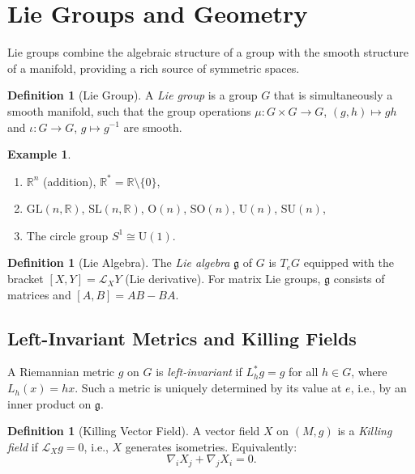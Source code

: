 \documentclass[12pt,a4paper]{amsart}
\theoremstyle{definition}
\newtheorem{definition}[theorem]{Definition}
\newtheorem{example}[theorem]{Example}
\begin{document}
\section{Lie Groups and Geometry}
\label{sec:liegroups}

Lie groups combine the algebraic structure of a group with the smooth
structure of a manifold, providing a rich source of symmetric spaces.

\begin{definition}[Lie Group]
A \emph{Lie group} is a group $G$ that is simultaneously a smooth manifold,
such that the group operations $\mu: G \times G \to G$, $(g,h) \mapsto gh$
and $\iota: G \to G$, $g \mapsto g^{-1}$ are smooth.
\end{definition}

\begin{example}
\begin{enumerate}[label=(\alph*)]
  \item $\mathbb{R}^n$ (addition), $\mathbb{R}^* = \mathbb{R} \setminus \{0\}$,
  \item $\mathrm{GL}(n,\mathbb{R})$, $\mathrm{SL}(n,\mathbb{R})$, $\mathrm{O}(n)$, $\mathrm{SO}(n)$, $\mathrm{U}(n)$, $\mathrm{SU}(n)$,
  \item The circle group $S^1 \cong \mathrm{U}(1)$.
\end{enumerate}
\end{example}

\begin{definition}[Lie Algebra]
The \emph{Lie algebra} $\mathfrak{g}$ of $G$ is $T_eG$ equipped with the
bracket $[X, Y] = \mathcal{L}_X Y$ (Lie derivative). For matrix Lie groups,
$\mathfrak{g}$ consists of matrices and $[A,B] = AB - BA$.
\end{definition}

\subsection{Left-Invariant Metrics and Killing Fields}

A Riemannian metric $g$ on $G$ is \emph{left-invariant} if
$L_h^* g = g$ for all $h \in G$, where $L_h(x) = hx$. Such a metric is
uniquely determined by its value at $e$, i.e., by an inner product on $\mathfrak{g}$.

\begin{definition}[Killing Vector Field]
A vector field $X$ on $(M, g)$ is a \emph{Killing field} if
$\mathcal{L}_X g = 0$, i.e., $X$ generates isometries. Equivalently:
\[
  \nabla_i X_j + \nabla_j X_i = 0.
\]
\end{definition}
\end{document}
